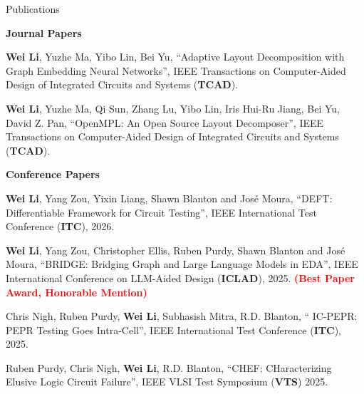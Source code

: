 \begin{rSection}{Publications}


    \textbf{Journal Papers}
    \begin{description}[font=\normalfont]
        \item[{[J2]}]{
            \textbf{Wei Li}, Yuzhe Ma, Yibo Lin, Bei Yu, 
            ``Adaptive Layout Decomposition with Graph Embedding Neural Networks'', IEEE Transactions on Computer-Aided Design of Integrated Circuits and Systems (\textbf{TCAD}).
        }
        \item[{[J1]}]{
            \textbf{Wei Li}, Yuzhe Ma, Qi Sun, Zhang Lu, Yibo Lin, Iris Hui-Ru Jiang, Bei Yu, David Z. Pan,
            ``OpenMPL: An Open Source Layout Decomposer'', IEEE Transactions on Computer-Aided Design of Integrated Circuits and Systems (\textbf{TCAD}).
        }
    \end{description}
\textbf{Conference Papers}
\begin{description}[font=\normalfont]
    \item[{[C18]}]{
        \textbf{Wei Li}, Yang Zou, Yixin Liang, Shawn Blanton and José Moura,
        ``DEFT: Differentiable Framework for Circuit Testing'', IEEE International Test Conference (\textbf{ITC}), 2026.
    }
    \item[{[C17]}]{
        \textbf{Wei Li}, Yang Zou, Christopher Ellis, Ruben Purdy, Shawn Blanton and José Moura,
        ``BRIDGE: Bridging Graph and Large Language Models in EDA'', IEEE International Conference on LLM-Aided Design (\textbf{ICLAD}), 2025. \textcolor{red}{\textbf{(Best Paper Award, Honorable Mention)}}
    }
    \item[{[C16]}]{
        Chris Nigh, Ruben Purdy, \textbf{Wei Li}, Subhasish Mitra, R.D. Blanton, 
        ``	IC-PEPR: PEPR Testing Goes Intra-Cell'', IEEE International Test Conference (\textbf{ITC}), 2025.
    }
    \item[{[C15]}]{
        Ruben Purdy, Chris Nigh, \textbf{Wei Li}, R.D. Blanton, ``CHEF: CHaracterizing Elusive Logic Circuit Failure”, IEEE VLSI Test Symposium (\textbf{VTS}) 2025.
    }


\end{description}
\end{rSection}
